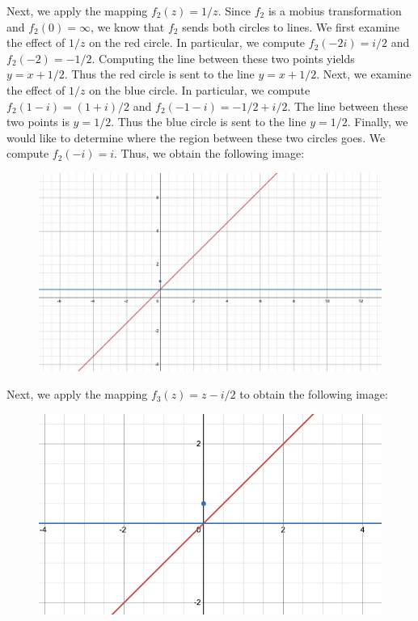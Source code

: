 \documentclass[12pt]{article}
\begin{document}
Next, we apply the mapping $f_2(z) = 1/z$. Since $f_2$ is a mobius transformation and $f_2(0) = \infty$, we know that $f_2$ sends both circles to lines. We first examine the effect of $1/z$ on the red circle. In particular, we compute $f_2(-2i) = i/2$ and $f_2(-2) = -1/2$. Computing the line between these two points yields $y = x + 1/2$. Thus the red circle is sent to the line $y = x+1/2$. Next, we examine the effect of $1/z$ on the blue circle. In particular, we compute $f_2(1-i)=(1+i)/2$ and $f_2(-1-i) = -1/2+i/2$. The line between these two points is $y = 1/2$. Thus the blue circle is sent to the line $y= 1/2$. Finally, we would like to determine where the region between these two circles goes. We compute $f_2(-i) = i$. Thus, we obtain the following image:
\begin{figure}[H]
\centering
\includegraphics[width=\textwidth]{Image3}
\end{figure}
Next, we apply the mapping $f_3(z) = z - i/2$ to obtain the following image:
\begin{figure}[H]
\centering
\includegraphics[width=\textwidth]{Image4}
\end{figure}
\end{document}
